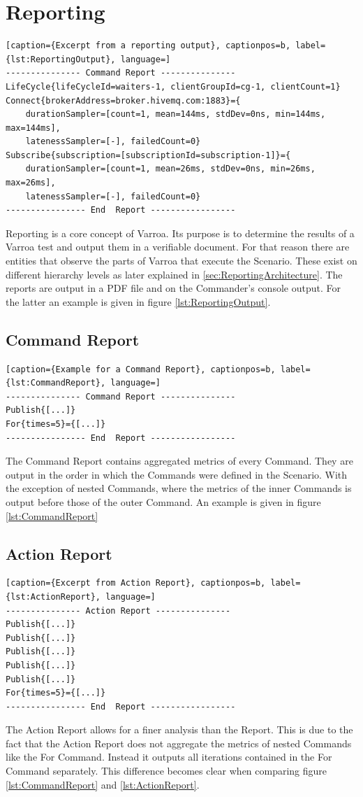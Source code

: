 \chapter{Reporting}\label{sec:Reporting}
\begin{lstlisting}[caption={Excerpt from a reporting output}, captionpos=b, label={lst:ReportingOutput}, language=]
--------------- Command Report ---------------
LifeCycle{lifeCycleId=waiters-1, clientGroupId=cg-1, clientCount=1}
Connect{brokerAddress=broker.hivemq.com:1883}={
	durationSampler=[count=1, mean=144ms, stdDev=0ns, min=144ms, max=144ms],
	latenessSampler=[-], failedCount=0}
Subscribe{subscription=[subscriptionId=subscription-1]}={
	durationSampler=[count=1, mean=26ms, stdDev=0ns, min=26ms, max=26ms],
	latenessSampler=[-], failedCount=0}
---------------- End  Report -----------------
\end{lstlisting}

Reporting is a core concept of Varroa.
Its purpose is to determine the results of a Varroa test and output them in a verifiable document.
For that reason there are entities that observe the parts of Varroa that execute the Scenario.
These exist on different hierarchy levels as later explained in \ref{sec:ReportingArchitecture}.
The reports are output in a PDF file and on the Commander's console output.
For the latter an example is given in figure \ref{lst:ReportingOutput}.

\section{Command Report}
\begin{lstlisting}[caption={Example for a Command Report}, captionpos=b, label={lst:CommandReport}, language=]
--------------- Command Report ---------------
Publish{[...]}
For{times=5}={[...]}
---------------- End  Report -----------------
\end{lstlisting}
The Command Report contains aggregated metrics of every Command.
They are output in the order in which the Commands were defined in the Scenario.
With the exception of nested Commands, where the metrics of the inner Commands is output before those of the outer Command.
An example is given in figure \ref{lst:CommandReport}

\section{Action Report}
\begin{lstlisting}[caption={Excerpt from Action Report}, captionpos=b, label={lst:ActionReport}, language=]
--------------- Action Report ---------------
Publish{[...]}
Publish{[...]}
Publish{[...]}
Publish{[...]}
Publish{[...]}
For{times=5}={[...]}
---------------- End  Report -----------------
\end{lstlisting}
The Action Report allows for a finer analysis than the Report.
This is due to the fact that the Action Report does not aggregate the metrics of nested Commands like the For Command.
Instead it outputs all iterations contained in the For Command separately.
This difference becomes clear when comparing figure \ref{lst:CommandReport} and \ref{lst:ActionReport}.

